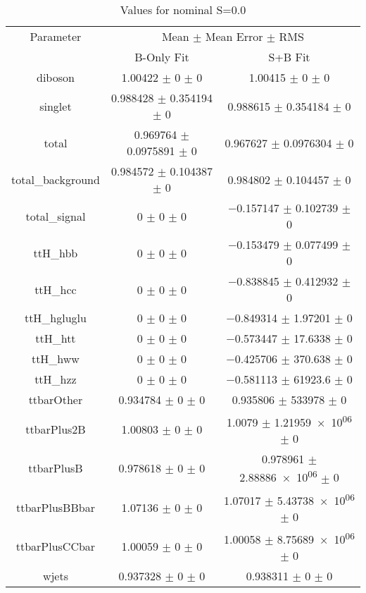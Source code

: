 \begin{table}
\centering
\caption{Values for nominal S=0.0}
\begin{tabular}{ccc}
\toprule
Parameter & \multicolumn{2}{c}{Mean $\pm$ Mean Error $\pm$ RMS}\\
 & B-Only Fit & S+B Fit\\
\midrule
diboson & \num{1.00422} $\pm$ \num{0} $\pm$ \num{0} & \num{1.00415} $\pm$ \num{0} $\pm$ \num{0}\\
singlet & \num{0.988428} $\pm$ \num{0.354194} $\pm$ \num{0} & \num{0.988615} $\pm$ \num{0.354184} $\pm$ \num{0}\\
total & \num{0.969764} $\pm$ \num{0.0975891} $\pm$ \num{0} & \num{0.967627} $\pm$ \num{0.0976304} $\pm$ \num{0}\\
total\_background & \num{0.984572} $\pm$ \num{0.104387} $\pm$ \num{0} & \num{0.984802} $\pm$ \num{0.104457} $\pm$ \num{0}\\
total\_signal & \num{0} $\pm$ \num{0} $\pm$ \num{0} & \num{-0.157147} $\pm$ \num{0.102739} $\pm$ \num{0}\\
ttH\_hbb & \num{0} $\pm$ \num{0} $\pm$ \num{0} & \num{-0.153479} $\pm$ \num{0.077499} $\pm$ \num{0}\\
ttH\_hcc & \num{0} $\pm$ \num{0} $\pm$ \num{0} & \num{-0.838845} $\pm$ \num{0.412932} $\pm$ \num{0}\\
ttH\_hgluglu & \num{0} $\pm$ \num{0} $\pm$ \num{0} & \num{-0.849314} $\pm$ \num{1.97201} $\pm$ \num{0}\\
ttH\_htt & \num{0} $\pm$ \num{0} $\pm$ \num{0} & \num{-0.573447} $\pm$ \num{17.6338} $\pm$ \num{0}\\
ttH\_hww & \num{0} $\pm$ \num{0} $\pm$ \num{0} & \num{-0.425706} $\pm$ \num{370.638} $\pm$ \num{0}\\
ttH\_hzz & \num{0} $\pm$ \num{0} $\pm$ \num{0} & \num{-0.581113} $\pm$ \num{61923.6} $\pm$ \num{0}\\
ttbarOther & \num{0.934784} $\pm$ \num{0} $\pm$ \num{0} & \num{0.935806} $\pm$ \num{533978} $\pm$ \num{0}\\
ttbarPlus2B & \num{1.00803} $\pm$ \num{0} $\pm$ \num{0} & \num{1.0079} $\pm$ \num{1.21959e+06} $\pm$ \num{0}\\
ttbarPlusB & \num{0.978618} $\pm$ \num{0} $\pm$ \num{0} & \num{0.978961} $\pm$ \num{2.88886e+06} $\pm$ \num{0}\\
ttbarPlusBBbar & \num{1.07136} $\pm$ \num{0} $\pm$ \num{0} & \num{1.07017} $\pm$ \num{5.43738e+06} $\pm$ \num{0}\\
ttbarPlusCCbar & \num{1.00059} $\pm$ \num{0} $\pm$ \num{0} & \num{1.00058} $\pm$ \num{8.75689e+06} $\pm$ \num{0}\\
wjets & \num{0.937328} $\pm$ \num{0} $\pm$ \num{0} & \num{0.938311} $\pm$ \num{0} $\pm$ \num{0}\\
\bottomrule
\end{tabular}
\end{table}